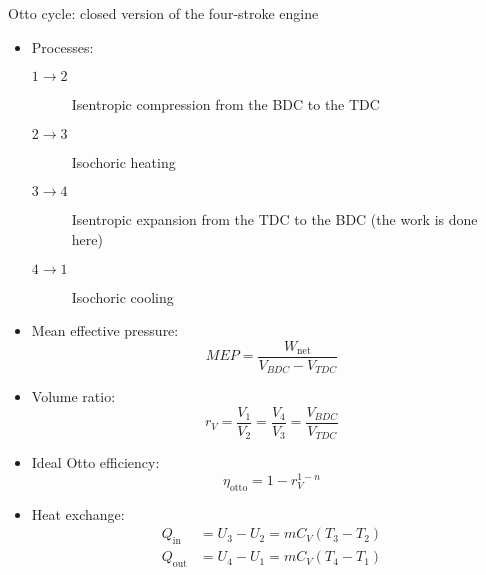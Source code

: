 \documentclass[10pt, twocolumn]{article}
\begin{document}
Otto cycle: closed version of the four-stroke engine
\begin{itemize}
  \item Processes:
        \begin{description}
          \item[\(1 \rightarrow 2\)] Isentropic compression from the BDC to the TDC
          \item[\(2 \rightarrow 3\)] Isochoric heating
          \item[\(3 \rightarrow 4\)] Isentropic expansion from the TDC to the BDC (the work is done here)
          \item[\(4 \rightarrow 1\)] Isochoric cooling
        \end{description}
  \item Mean effective pressure:
        \[
          MEP = \frac{W_{\mathrm{net}}}{V_{BDC} - V_{TDC}}
        \]
  \item Volume ratio:
        \[
          r_V = \frac{V_1 }{V_2 } = \frac{V_4 }{V_3 } = \frac{V_{BDC}}{V_{TDC}}
        \]
  \item Ideal Otto efficiency:
        \[
          \eta_{\mathrm{otto}} = 1 - r_V ^{1 - n}
        \]
  \item Heat exchange:
        \begin{align*}
          Q_{\mathrm{in}}  & = U_3 - U_2 = mC_V \left( T_3 - T_2 \right) \\
          Q_{\mathrm{out}} & = U_4 - U_1 = mC_V \left( T_4 - T_1 \right)
        \end{align*}
\end{itemize}
\end{document}
